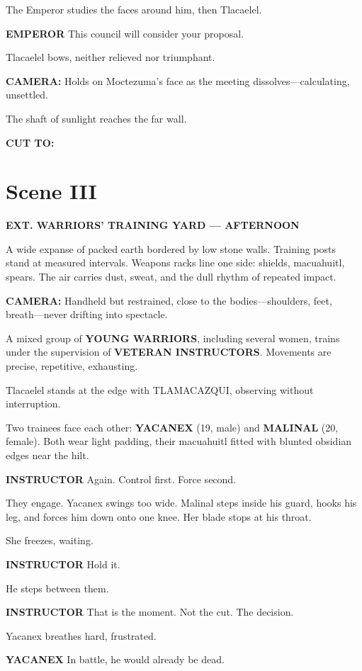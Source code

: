 \documentclass[12pt]{article}
\begin{document}
The Emperor studies the faces around him, then Tlacaelel.

\textbf{EMPEROR}  
This council will consider your proposal.

Tlacaelel bows, neither relieved nor triumphant.

\textbf{CAMERA:} Holds on Moctezuma’s face as the meeting dissolves—calculating, unsettled.

The shaft of sunlight reaches the far wall.

\textbf{CUT TO:}

\section*{Scene III}

\textbf{EXT. WARRIORS’ TRAINING YARD — AFTERNOON}

A wide expanse of packed earth bordered by low stone walls. Training posts stand at measured intervals. Weapons racks line one side: shields, macuahuitl, spears. The air carries dust, sweat, and the dull rhythm of repeated impact.

\textbf{CAMERA:} Handheld but restrained, close to the bodies—shoulders, feet, breath—never drifting into spectacle.

A mixed group of \textbf{YOUNG WARRIORS}, including several women, trains under the supervision of \textbf{VETERAN INSTRUCTORS}. Movements are precise, repetitive, exhausting.

Tlacaelel stands at the edge with TLAMACAZQUI, observing without interruption.

Two trainees face each other: \textbf{YACANEX} (19, male) and \textbf{MALINAL} (20, female). Both wear light padding, their macuahuitl fitted with blunted obsidian edges near the hilt.

\textbf{INSTRUCTOR}  
Again.  
Control first. Force second.

They engage. Yacanex swings too wide. Malinal steps inside his guard, hooks his leg, and forces him down onto one knee. Her blade stops at his throat.

She freezes, waiting.

\textbf{INSTRUCTOR}  
Hold it.

He steps between them.

\textbf{INSTRUCTOR}  
That is the moment.  
Not the cut.  
The decision.

Yacanex breathes hard, frustrated.

\textbf{YACANEX}  
In battle, he would already be dead.
\end{document}
